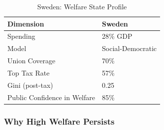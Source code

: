 \begin{table}[h]
\centering
\caption{Sweden: Welfare State Profile}
\label{tab:sweden-profile}
\begin{tabular}{ll}
\toprule
\textbf{Dimension} & \textbf{Sweden} \\
\midrule
Spending & 28\% GDP \\
Model & Social-Democratic \\
Union Coverage & 70\% \\
Top Tax Rate & 57\% \\
Gini (post-tax) & 0.25 \\
Public Confidence in Welfare & 85\% \\
\bottomrule
\end{tabular}
\end{table}

\subsubsection{Why High Welfare Persists}

